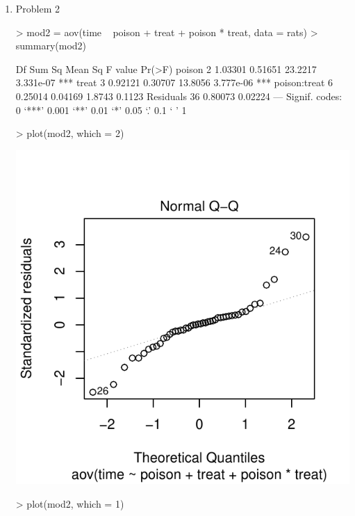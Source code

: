 \documentclass[11pt,letterpaper]{article}
\begin{document}
\begin{enumerate}
\item Problem 2
\begin{Schunk}
\begin{Sinput}
> mod2 = aov(time ~ poison + treat + poison * treat, data = rats)
> summary(mod2)
\end{Sinput}
\begin{Soutput}
             Df  Sum Sq Mean Sq F value    Pr(>F)    
poison        2 1.03301 0.51651 23.2217 3.331e-07 ***
treat         3 0.92121 0.30707 13.8056 3.777e-06 ***
poison:treat  6 0.25014 0.04169  1.8743    0.1123    
Residuals    36 0.80073 0.02224                      
---
Signif. codes:  0 ‘***’ 0.001 ‘**’ 0.01 ‘*’ 0.05 ‘.’ 0.1 ‘ ’ 1 
\end{Soutput}
\end{Schunk}
\begin{Schunk}
\begin{Sinput}
> plot(mod2, which = 2)
\end{Sinput}
\end{Schunk}
\includegraphics{midterm2-005}
\begin{Schunk}
\begin{Sinput}
> plot(mod2, which = 1)
\end{Sinput}
\end{Schunk}

\end{enumerate}
\end{document}
